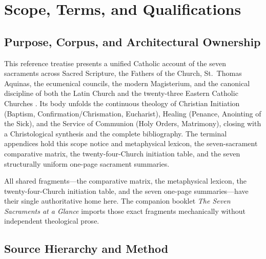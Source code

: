\section{Scope, Terms, and Qualifications}
\label{app:scope-terms-qualifications}

\subsection{Purpose, Corpus, and Architectural Ownership}
\label{subsec:scope-purpose-corpus}

This reference treatise presents a unified Catholic account of the seven sacraments across Sacred Scripture, the Fathers of the Church, St.~Thomas Aquinas, the ecumenical councils, the modern Magisterium, and the canonical discipline of both the Latin Church and the twenty-three Eastern Catholic Churches . Its body unfolds the continuous theology of Christian Initiation (Baptism, Confirmation/Chrismation, Eucharist), Healing (Penance, Anointing of the Sick), and the Service of Communion (Holy Orders, Matrimony), closing with a Christological synthesis and the complete bibliography. The terminal appendices hold this scope notice and metaphysical lexicon, the seven-sacrament comparative matrix, the twenty-four-Church initiation table, and the seven structurally uniform one-page sacrament summaries.

All shared fragments---the comparative matrix, the metaphysical lexicon, the twenty-four-Church initiation table, and the seven one-page summaries---have their single authoritative home here. The companion booklet \emph{The Seven Sacraments at a Glance} imports those exact fragments mechanically without independent theological prose.

\subsection{Source Hierarchy and Method}
\label{subsec:scope-method}


